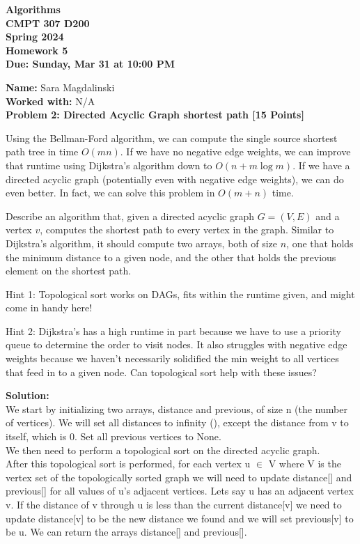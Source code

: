 \documentclass[12pt]{article}
\newcommand{\Name}[1]{\noindent \textbf{Name:} #1 \\}
\newcommand{\Workedwith}[1]{\noindent \textbf{Worked with:} #1 \\}
\newcommand{\Problem}[3]{\mbox{} \newline \noindent \textbf{\textbf{Problem #1: #2 [#3 Points] \\ }}}
\begin{document}
\begin{center}
  \bf
  Algorithms \\
  CMPT 307 D200 \\
  Spring 2024 \\
  \rm
  Homework 5\\
  Due:  Sunday, Mar 31 at 10:00 PM \\
\end{center}

\Name{Sara Magdalinski}
\Workedwith{N/A}

\Problem{2}{Directed Acyclic Graph shortest path}{15}

Using the Bellman-Ford algorithm, we can compute the single source shortest path tree in time $O(mn)$.
If we have no negative edge weights, we can improve that runtime using Dijkstra's algorithm down to $O(n + m \log m)$.
If we have a directed acyclic graph (potentially even with negative edge weights), we can do even better.
In fact, we can solve this problem in $O(m + n)$ time.

Describe an algorithm that, given a directed acyclic graph $G = (V, E)$ and a vertex $v$, computes the shortest path to every vertex in the graph.
Similar to Dijkstra's algorithm, it should compute two arrays, both of size $n$, one that holds the minimum distance to a given node, and the other that holds the previous element on the shortest path.

Hint 1: Topological sort works on DAGs, fits within the runtime given, and might come in handy here!

Hint 2: Dijkstra's has a high runtime in part because we have to use a priority queue to determine the order to visit nodes. It also struggles with negative edge weights because we haven't necessarily solidified the min weight to all vertices that feed in to a given node. Can topological sort help with these issues?

\textbf{Solution:}\\

We start by initializing two arrays, distance and previous, of size n (the number of vertices). We will set all distances to infinity (), except the distance from v to itself, which is 0. Set all previous vertices to None.\\

We then need to perform a topological sort on the directed acyclic graph. \\

After this topological sort is performed, for each vertex u $ \in$ V where V is the vertex set of the topologically sorted graph we will need to update distance[] and previous[] for all values of u's adjacent vertices. Lets say u has an adjacent vertex v. If the distance of v through u is less than the current distance[v] we need to update distance[v] to be the new distance we found and we will set previous[v] to be u. We can return the arrays distance[] and previous[]. \\
\end{document}
